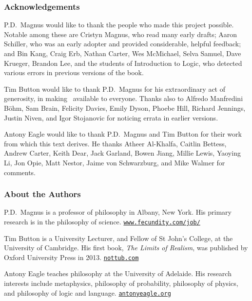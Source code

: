 \thispagestyle{empty}
\onecolumn



\subsubsection*{Acknowledgements}
P.D.\ Magnus would like to thank the people who made this project possible. Notable among these are Cristyn Magnus, who read many early drafts; Aaron Schiller, who was an early adopter and provided considerable, helpful feedback; {and} Bin Kang, Craig Erb, Nathan Carter, Wes McMichael, Selva Samuel,  Dave Krueger, Brandon Lee, and the students of Introduction to Logic, who detected various errors in previous versions of the book. \medskip

Tim Button would like to thank P.D.\ Magnus for his extraordinary act of generosity, in making \forallx\ available to everyone. Thanks also to Alfredo Manfredini Böhm, Sam Brain, Felicity Davies, Emily Dyson, Phoebe Hill, Richard Jennings, Justin Niven,  and Igor Stojanovic for noticing errata in earlier versions. \medskip

Antony Eagle would like to thank P.D.\ Magnus and Tim Button for their work from which this text derives. He thanks Atheer Al-Khalfa, Caitlin Bettess, Andrew Carter, Keith Dear, Jack Garland, Bowen Jiang, Millie Lewis, Yaoying Li, Jon Opie, Matt Nestor, Jaime von Schwarzburg, and Mike Walmer for comments. %

\subsubsection*{About the Authors}


P.D.\ Magnus is a professor of philosophy in Albany, New York. His primary research is in the philosophy of science. \href{https://www.fecundity.com/job/}{\nolinkurl{www.fecundity.com/job/}}
\medskip

Tim Button is a University Lecturer, and Fellow of St John's College, at the University of Cambridge. His first book, \emph{The Limits of Realism}, was published by Oxford University Press in 2013. \href{http://nottub.com}{\nolinkurl{nottub.com}}
\medskip

Antony Eagle teaches philosophy at the University of Adelaide. His research interests include metaphysics, philosophy of probability, philosophy of physics, and philosophy of logic and language. \href{https://antonyeagle.org}{\nolinkurl{antonyeagle.org}}



